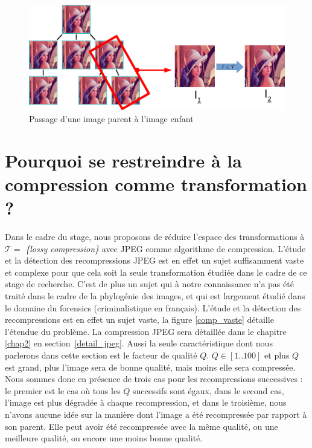 \documentclass[utf8,final]{stageM2R} %
\begin{document}
\begin{figure}
  \begin{center}
    \includegraphics[width=120mm]{images/tree_extract}
    \caption{Passage d'une image parent à l'image enfant}
    \label{fig:tree-extract}
  \end{center}
\end{figure}

\section{Pourquoi se restreindre à la compression comme transformation ?}
Dans le cadre du stage, nous proposons de réduire l'espace des transformations à $\mathcal{T} =$ \textit{\{lossy compression\}} avec JPEG comme algorithme de compression. L'étude et la détection des recompressions JPEG est en effet un sujet suffisamment vaste et complexe pour que cela soit la seule transformation étudiée dans le cadre de ce stage de recherche. C'est de plus un sujet qui à notre connaissance n'a pas été traité dans le cadre de la phylogénie des images, et qui est largement étudié dans le domaine du forensics (criminalistique en français). L'étude et la détection des recompressions est en effet un sujet vaste, la figure \ref{comp_vaste} détaille l'étendue du problème. La compression JPEG sera détaillée dans le chapitre \ref{chap2} en section~\ref{detail_jpeg}. Aussi la seule caractéristique dont nous parlerons dans cette section est le facteur de qualité $Q$. $Q \in [1..100]$ et plus $Q$ est grand, plus l'image sera de bonne qualité, mais moins elle sera compressée. Nous sommes donc en présence de trois cas pour les recompressions successives : le premier est le cas où tous les $Q$ successifs sont égaux, dans le second cas, l'image est plus dégradée à chaque recompression, et dans le troisième, nous n'avons aucune idée sur la manière dont l'image a été recompressée par rapport à son parent. Elle peut avoir été recompressée avec la même qualité, ou une meilleure qualité, ou encore une moins bonne qualité.
\end{document}
